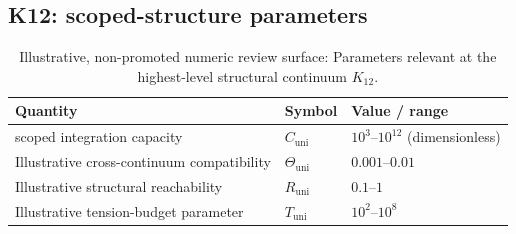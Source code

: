 
\subsection*{K12: scoped-structure parameters}

\begin{table}[htbp]
  \centering
  \caption{Illustrative, non-promoted numeric review surface: Parameters relevant at the highest-level structural continuum \(K_{12}\).}
  \label{tab:k12-scoped-parameters}
  \begin{tabular}{@{}L{0.44\textwidth}L{0.16\textwidth}L{0.23\textwidth}@{}}
    \hline
    Quantity & Symbol & Value / range \\
    \hline
    scoped integration capacity & \(C_\mathrm{uni}\)
        & \(10^3\text{–}10^{12}\) (dimensionless) \\
    Illustrative cross-continuum compatibility & \(\Theta_\mathrm{uni}\)
        & \(0.001\text{–}0.01\) \\
    Illustrative structural reachability & \(R_\mathrm{uni}\)
        & \(0.1\text{–}1\) \\
    Illustrative tension-budget parameter & \(T_\mathrm{uni}\)
        & \(10^2\text{–}10^8\) \\
    \hline
  \end{tabular}
\end{table}

\endgroup
